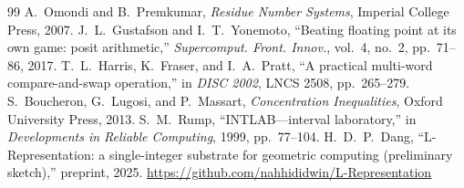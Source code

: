 \documentclass[11pt,a4paper]{article}
\theoremstyle{definition}
\theoremstyle{plain}
\theoremstyle{remark}
\begin{document}
\begin{thebibliography}{99}
 A.~Omondi and B.~Premkumar, \emph{Residue Number Systems}, Imperial College Press, 2007.
 J.~L.~Gustafson and I.~T.~Yonemoto, ``Beating floating point at its own game: posit arithmetic,'' \emph{Supercomput. Front. Innov.}, vol.~4, no.~2, pp.~71--86, 2017.
 T.~L.~Harris, K.~Fraser, and I.~A.~Pratt, ``A practical multi-word compare-and-swap operation,'' in \emph{DISC 2002}, LNCS 2508, pp.~265--279.
 S.~Boucheron, G.~Lugosi, and P.~Massart, \emph{Concentration Inequalities}, Oxford University Press, 2013.
 S.~M.~Rump, ``INTLAB---interval laboratory,'' in \emph{Developments in Reliable Computing}, 1999, pp.~77--104.
 H.~D.~P.~Dang, ``L-Representation: a single-integer substrate for geometric computing (preliminary sketch),'' preprint, 2025. \url{https://github.com/nahhididwin/L-Representation}
\end{thebibliography}
\end{document}
